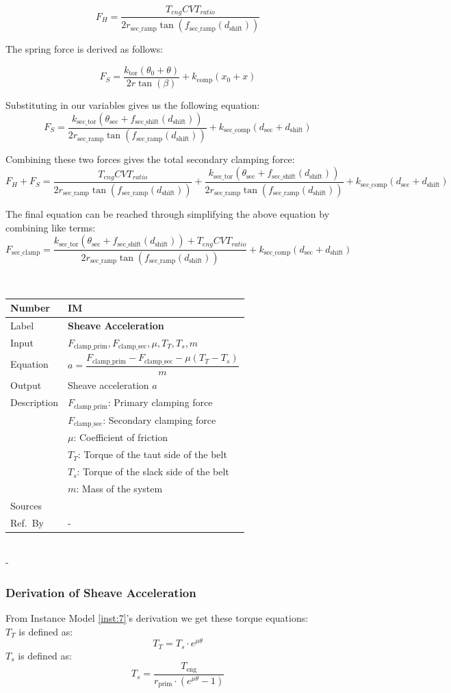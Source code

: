 \documentclass[12pt]{article}
\newcommand{\colAwidth}{0.13\textwidth}
\newcommand{\colBwidth}{0.82\textwidth}
\newcounter{instnum} %
\newcommand{\definstance}[7] {
~\newline
\noindent
\begin{minipage}{\textwidth}
\renewcommand*{\arraystretch}{1.5}
\begin{tabular}{| p{\colAwidth} | p{\colBwidth}|}
  \hline
  \rowcolor[gray]{0.9}
  Number& IM\refstepcounter{instnum}\theinstnum \label{inst:\theinstnum}\\
  \hline
  Label& \bf #1 \\
  \hline
  Input& #2\\
  \hline
  Equation& #3\\
  \hline
  Output& #4\\
  \hline
  Description& #5 \\
  \hline
  Sources& #6 \\
  \hline
  Ref.\ By & #7\\
  \hline
\end{tabular}
\end{minipage}\\
}
\begin{document}
\[
F_H = \frac{T_{eng} CVT_{ratio}}{2 r_{\text{sec\_ramp}} \tan(f_{\text{sec\_ramp}}(d_{\text{shift}}))}
\]

The spring force is derived as follows:

\[
F_S = \frac{k_{\text{tor}}(\theta_0 + \theta)}{2r\tan(\beta)} + k_\text{comp}(x_0 + x)
\]

Substituting in our variables gives us the following equation:
\[
F_S = \frac{k_{\text{sec\_tor}} (\theta_{\text{sec}} + f_{\text{sec\_shift}}(d_{\text{shift}}))}{2 r_{\text{sec\_ramp}} \tan(f_{\text{sec\_ramp}}(d_{\text{shift}}))} + k_{\text{sec\_comp}} (d_{\text{sec}} + d_{\text{shift}})
\]

Combining these two forces gives the total secondary clamping force:
\[
F_H + F_S = \frac{T_{eng} CVT_{ratio}}{2 r_{\text{sec\_ramp}} \tan(f_{\text{sec\_ramp}}(d_{\text{shift}}))} + \frac{k_{\text{sec\_tor}} (\theta_{\text{sec}} + f_{\text{sec\_shift}}(d_{\text{shift}}))}{2 r_{\text{sec\_ramp}} \tan(f_{\text{sec\_ramp}}(d_{\text{shift}}))} + k_{\text{sec\_comp}} (d_{\text{sec}} + d_{\text{shift}})
\]

The final equation can be reached through simplifying the above equation by combining like terms:
\[
F_{\text{sec\_clamp}} = \frac{k_{\text{sec\_tor}} (\theta_{\text{sec}} + f_{\text{sec\_shift}}(d_{\text{shift}})) + T_{eng} CVT_{ratio}}{2 r_{\text{sec\_ramp}} \tan(f_{\text{sec\_ramp}}(d_{\text{shift}}))} + k_{\text{sec\_comp}} (d_{\text{sec}} + d_{\text{shift}})
\]

\definstance
{Sheave Acceleration}
{$F_{\text{clamp\_prim}}, F_{\text{clamp\_sec}}, \mu, T_T, T_s, m$} %
{\[a = \frac{F_{\text{clamp\_prim}} - F_{\text{clamp\_sec}} - \mu (T_T - T_s)}{m}\]} %
{Sheave acceleration $a$} %
{$F_{\text{clamp\_prim}}$: Primary clamping force\\
  &$F_{\text{clamp\_sec}}$: Secondary clamping force\\
  &$\mu$: Coefficient of friction\\
  &$T_T$: Torque of the taut side of the belt\\
  &$T_s$: Torque of the slack side of the belt\\
  &$m$: Mass of the system} %
{} %
{-}
{} %
{} %
{-}

\subsubsection*{Derivation of Sheave Acceleration}
From Instance Model \ref{inst:7}'s derivation we get these torque equations:\\
$T_T$ is defined as: \[T_T = T_s \cdot e^{\mu \theta}\]
$T_s$ is defined as: \[T_s = \frac{T_{\text{eng}}}{r_{\text{prim}} \cdot (e^{\mu \theta} - 1)}\]
\end{document}
